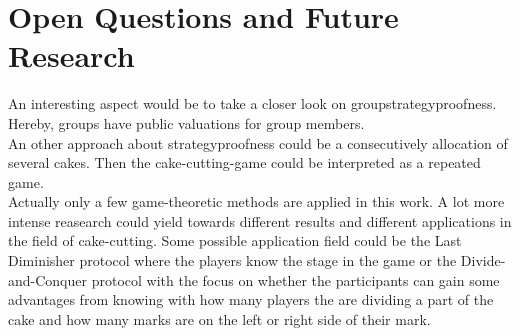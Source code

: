 \section{Open Questions and Future Research}
An interesting aspect would be to take a closer look on groupstrategyproofness. Hereby, groups have public valuations for group members.\\
\newline
An other approach about strategyproofness could be a consecutively allocation of several cakes. Then the cake-cutting-game could be interpreted as a repeated game. \\
Actually only a few game-theoretic methods are applied in this work. A lot more intense reasearch could yield towards different results and different applications in the field of cake-cutting. Some possible application field could be the Last Diminisher protocol where the players know the stage in the game or the Divide-and-Conquer protocol with the focus on whether the participants can gain some advantages from knowing with how many players the are dividing a part of the cake and how many marks are on the left or right side of their mark. 

\pagebreak


\clearpage


\thispagestyle{empty}
\pagestyle{plain}
\clearpage

\listoffigures

\listoftables
\thispagestyle{empty}
\pagestyle{plain}
